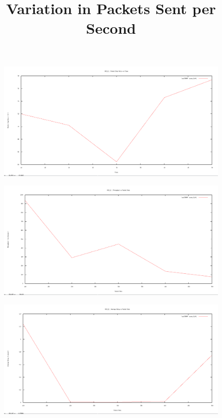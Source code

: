 \documentclass[12pt]{article}
\begin{document}
\begin{figure}[H]
	\centering
	\includegraphics[scale=	0.26]{image/802.15.4/Packetdropratio_vs_flows.png}
\end{figure}


\newpage
\title{Variation in Packets Sent per Second}
\begin{figure}[H]
	\centering
	\includegraphics[scale=	0.26]{image/802.15.4/Throughput_vs_packetRates.png}
\end{figure}

\begin{figure}[H]
	\centering
	\includegraphics[scale=	0.26]{image/802.15.4/Averagedelay_vs_packetRates.png}
\end{figure}
\end{document}
